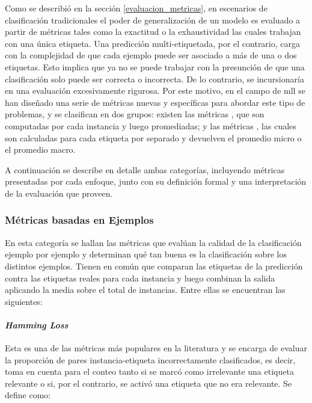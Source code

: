 Como se describió en la sección \ref{evaluacion_metricas}, en escenarios de
clasificación tradicionales el poder de generalización de un modelo es evaluado
a partir de métricas tales como la exactitud o la exhaustividad las cuales
trabajan con una única etiqueta. Una predicción multi-etiquetada, por el
contrario, carga con la complejidad de que cada ejemplo puede ser asociado a más
de una o dos etiquetas. Esto implica que ya no se puede trabajar con la
presunción de que una clasificación solo puede ser correcta o incorrecta. De lo
contrario, se incursionaría en una evaluación excesivamente rigurosa. Por este
motivo, en el campo de \acrshort{mll} se han diseñado una serie de métricas
nuevas y específicas para abordar este tipo de problemas, y se clasifican en dos
grupos: existen las métricas , que son computadas
por cada instancia y luego promediadas; y las métricas , las cuales son calculadas para cada etiqueta por separado y
devuelven el promedio micro o el promedio macro.

A continuación se describe en detalle ambas categorías, incluyendo métricas
presentadas por cada enfoque, junto con su definición formal y una
interpretación de la evaluación que proveen.

\subsubsection{Métricas basadas en Ejemplos}

En esta categoría se hallan las métricas que evalúan la calidad de la
clasificación ejemplo por ejemplo y determinan qué tan buena es la clasificación
sobre los distintos ejemplos. Tienen en común que comparan las etiquetas de la
predicción contra las etiquetas reales para cada instancia y luego combinan la
salida aplicando la media sobre el total de instancias. Entre ellas se
encuentran las siguientes:

\paragraph{\textit{Hamming Loss}}

Esta es una de las métricas más populares en la literatura y se encarga de
evaluar la proporción de pares instancia-etiqueta incorrectamente clasificados,
es decir, toma en cuenta para el conteo tanto si se marcó como irrelevante una
etiqueta relevante o si, por el contrario, se activó una etiqueta que no era
relevante. Se define como:

